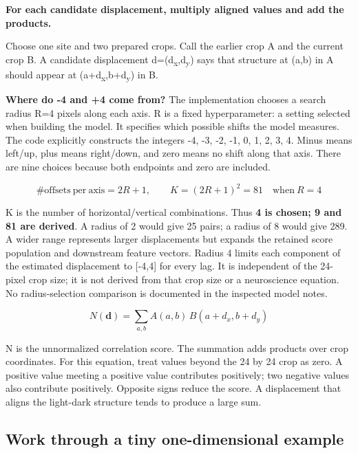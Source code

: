 \documentclass[11pt,letterpaper]{article}
\begin{document}
\textbf{For each candidate displacement, multiply aligned values and add the products.}


Choose one site and two prepared crops. Call the earlier crop A and the current crop B. A candidate displacement d=(d\textsubscript{x},d\textsubscript{y}) says that structure at (a,b) in A should appear at (a+d\textsubscript{x},b+d\textsubscript{y}) in B.


\textbf{Where do -4 and +4 come from?} The implementation chooses a search radius R=4 pixels along each axis. R is a fixed hyperparameter: a setting selected when building the model. It specifies which possible shifts the model measures. The code explicitly constructs the integers -4, -3, -2, -1, 0, 1, 2, 3, 4. Minus means left/\allowbreak{}up, plus means right/\allowbreak{}down, and zero means no shift along that axis. There are nine choices because both endpoints and zero are included.


\begin{equation}\#\mathrm{offsets\ per\ axis}=2R+1,\qquad K=(2R+1)^2=81\quad\mathrm{when}\ R=4\end{equation}

K is the number of horizontal/\allowbreak{}vertical combinations. Thus \textbf{4 is chosen; 9 and 81 are derived}. A radius of 2 would give 25 pairs; a radius of 8 would give 289. A wider range represents larger displacements but expands the retained score population and downstream feature vectors. Radius 4 limits each component of the estimated displacement to [-4,4] for every lag. It is independent of the 24-pixel crop size; it is not derived from that crop size or a neuroscience equation. No radius-selection comparison is documented in the inspected model notes.


\begin{equation}N(\mathbf d)=\sum_{a,b} A(a,b)\,B(a+d_x,b+d_y)\end{equation}

N is the unnormalized correlation score. The summation adds products over crop coordinates. For this equation, treat values beyond the 24 by 24 crop as zero. A positive value meeting a positive value contributes positively; two negative values also contribute positively. Opposite signs reduce the score. A displacement that aligns the light-dark structure tends to produce a large sum.


\subsection*{Work through a tiny one-dimensional example}
\end{document}
